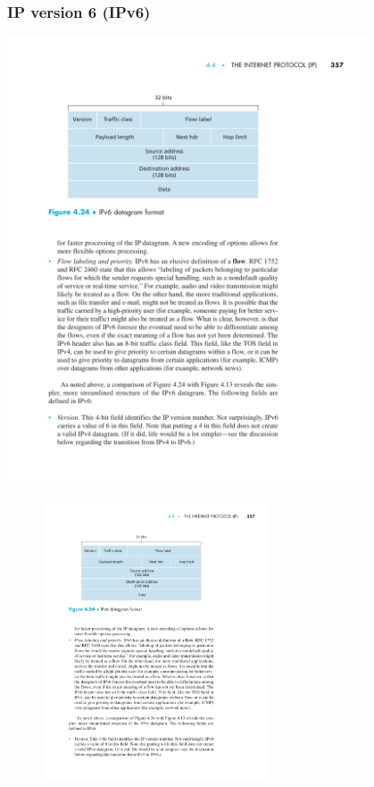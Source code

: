 \documentclass[xcolor=dvipsnames,10pt,compress,aspectratio=169]{beamer}
\begin{document}
\begin{frame}
  \frametitle{IP version 6 (IPv6)}
{
  \centering
  \includegraphics[width=0.8\textwidth]{kurose-04-24}
}
{
  \begin{figure}[ht]
  \centering
  \includegraphics[width=0.6\textwidth]{kurose-04-24}
  \end{figure}
}
\end{frame}
\end{document}
